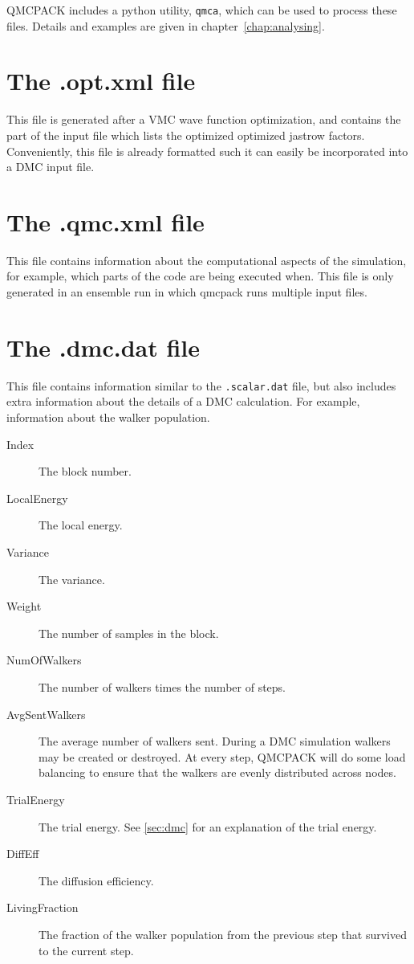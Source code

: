 QMCPACK includes a python utility, \texttt{qmca}, which can be used to process these files. Details and examples are given in chapter~\ref{chap:analysing}.
\section{The .opt.xml file}
\label{sec:optxml_file}
This file is generated after a VMC wave function optimization, and contains the part of the input file which lists the optimized optimized jastrow factors.
Conveniently, this file is already formatted such it can easily be incorporated into a DMC input file.

\section{The .qmc.xml file}
\label{sec:qmc_file}
This file contains information about the computational aspects of the simulation, for example, which parts of the code are being executed when. This file is only generated in an ensemble run in which qmcpack runs multiple input files.

\section{The .dmc.dat file}
\label{sec:dmc_file}
This file contains information similar to the \texttt{.scalar.dat} file, but also includes extra information about the details of a DMC calculation. For example, information about the walker population.

\begin{description}
\item[Index] The block number.
\item[LocalEnergy] The local energy.
\item[Variance] The variance.
\item[Weight] The number of samples in the block.
\item[NumOfWalkers] The number of walkers times the number of steps.
\item[AvgSentWalkers] The average number of walkers sent. During a DMC simulation walkers may be created or destroyed. At every step, QMCPACK will do some load balancing to ensure that the walkers are evenly distributed across nodes.
\item[TrialEnergy] The trial energy. See \ref{sec:dmc} for an explanation of the trial energy.
\item[DiffEff] The diffusion efficiency.
\item[LivingFraction] The fraction of the walker population from the previous step that survived to the current step.
\end{description}


